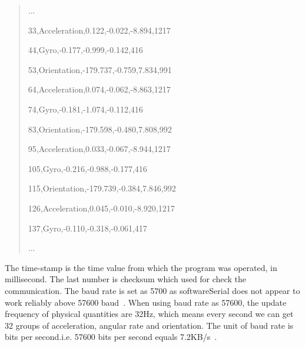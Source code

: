 \begin{quote}
\centering
...

33,Acceleration,0.122,-0.022,-8.894,1217

44,Gyro,-0.177,-0.999,-0.142,416

53,Orientation,-179.737,-0.759,7.834,991

64,Acceleration,0.074,-0.062,-8.863,1217

74,Gyro,-0.181,-1.074,-0.112,416

83,Orientation,-179.598,-0.480,7.808,992

95,Acceleration,0.033,-0.067,-8.944,1217

105,Gyro,-0.216,-0.988,-0.177,416

115,Orientation,-179.739,-0.384,7.846,992

126,Acceleration,0.045,-0.010,-8.920,1217

137,Gyro,-0.110,-0.318,-0.061,417

...
\end{quote}

The time-stamp is the time value from which the program was operated, in millisecond. The last number is checksum which used for check the communication.
The baud rate is set as 5700 as softwareSerial does not appear to work reliably above 57600 baud~\cite{ardusatsdk}.
When using baud rate as 57600, the update frequency of physical quantities are 32Hz, which means every second we can get 32 groups of acceleration, angular rate and orientation. The unit of baud rate is bits per second.i.e. 57600 bits per second equals 7.2KB/s~\cite{dong1994device}.

